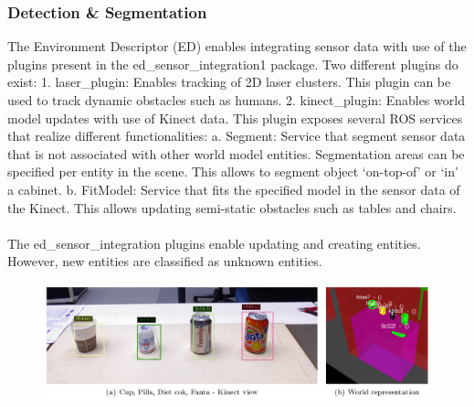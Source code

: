 \subsubsection{Detection \& Segmentation}
The Environment Descriptor (ED) enables integrating sensor data with use of the plugins present in the ed\_sensor\_integration1 package. Two different plugins do exist:
1. laser\_plugin: Enables tracking of 2D laser clusters. This plugin can be used to track dynamic obstacles such as humans. 
2. kinect\_plugin: Enables world model updates with use of Kinect data. This plugin exposes several ROS services that realize different functionalities:
a. Segment: Service that segment sensor data that is not associated with other world model entities. Segmentation areas can be specified per entity in the scene. This allows to segment object ‘on-top-of’ or ‘in’ a cabinet.
b. FitModel: Service that fits the specified model in the sensor data of the Kinect. This allows updating semi-static obstacles such as tables and chairs.
\\\\
The ed\_sensor\_integration plugins enable updating and creating entities. However, new entities are classified as unknown entities. 
\begin{figure}[ht]
	\includegraphics[width = \linewidth]{Figures/ed_perception}
	\label{fig:ed_perception}
\end{figure}

